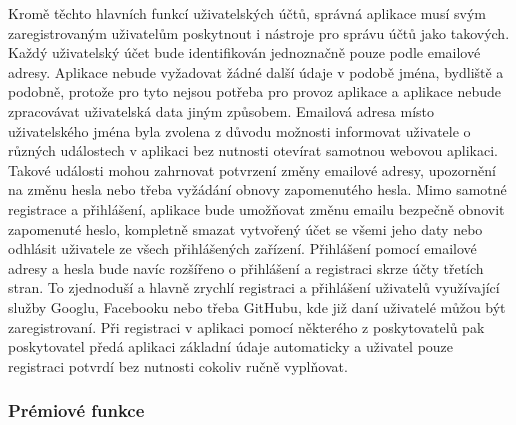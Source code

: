 	Kromě těchto hlavních funkcí uživatelských účtů, správná aplikace musí svým zaregistrovaným uživatelům poskytnout
	i nástroje pro správu účtů jako takových.
	Každý uživatelský účet bude identifikován jednoznačně pouze podle emailové adresy.
	Aplikace nebude vyžadovat žádné další údaje v podobě jména, bydliště a podobně, protože pro tyto nejsou potřeba pro
	provoz aplikace a aplikace nebude zpracovávat uživatelská data jiným způsobem.
	Emailová adresa místo uživatelského jména byla zvolena z důvodu možnosti informovat uživatele o různých událostech
	v aplikaci bez nutnosti otevírat samotnou webovou aplikaci.
	Takové události mohou zahrnovat potvrzení změny emailové adresy, upozornění na změnu hesla nebo třeba vyžádání obnovy
	zapomenutého hesla.
	Mimo samotné registrace a přihlášení, aplikace bude umožňovat změnu emailu bezpečně obnovit zapomenuté heslo, kompletně
	smazat vytvořený účet se všemi jeho daty nebo odhlásit uživatele ze všech přihlášených zařízení.
	Přihlášení pomocí emailové adresy a hesla bude navíc rozšířeno o přihlášení a registraci skrze účty třetích stran.
	To zjednoduší a hlavně zrychlí registraci a přihlášení uživatelů využívající služby Googlu, Facebooku nebo třeba
	GitHubu, kde již daní uživatelé můžou být zaregistrovaní.
	Při registraci v aplikaci pomocí některého z poskytovatelů pak poskytovatel předá aplikaci základní údaje automaticky
	a uživatel pouze registraci potvrdí bez nutnosti cokoliv ručně vyplňovat.

		\subsubsection{Prémiové funkce}

